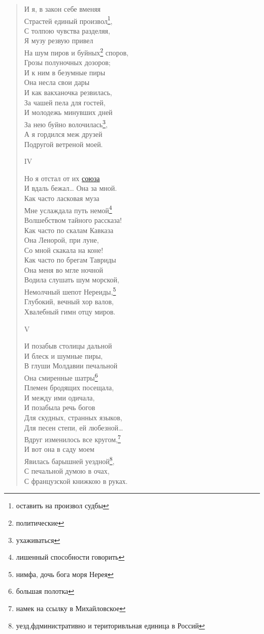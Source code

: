 \begin{verse}
И я, в закон себе вменяя\\
Страстей единый произвол\footnote{оставить на произвол судбы},\\
С толпою чувства разделяя,\\
Я музу резвую привел\\
На шум пиров и буйных\footnote{политические} споров,\\
Грозы полуночных дозоров;\\
И к ним в безумные пиры\\
Она несла свои дары\\
И как вакханочка резвилась,\\
За чашей пела для гостей,\\
И молодежь минувших дней\\
За нею буйно волочилась\footnote{ухаживаться},\\
А я гордился меж друзей\\
Подругой ветреной моей.

IV

Но я отстал от их \hyperref[soiuz]{союза}\\
И вдаль бежал… Она за мной.\\
Как часто ласковая муза\\
Мне услаждала путь немой\footnote{лишенный способности говорить}\\
Волшебством тайного рассказа!\\
Как часто по скалам Кавказа\\
Она Ленорой, при луне,\\
Со мной скакала на коне!\\
Как часто по брегам Тавриды\\
Она меня во мгле ночной\\
Водила слушать шум морской,\\
Немолчный шепот Нереиды,\footnote{нимфа, дочь бога моря Нерея}\\
Глубокий, вечный хор валов,\\
Хвалебный гимн отцу миров.

V

И позабыв столицы дальной\\
И блеск и шумные пиры,\\
В глуши Молдавии печальной\\
Она смиренные шатры\footnote{большая полотка}\\
Племен бродящих посещала,\\
И между ими одичала,\\
И позабыла речь богов\\
Для скудных, странных языков,\\
Для песен степи, ей любезной…\\
Вдруг изменилось все кругом,\footnote{намек на ссылку в Михайловское}\\
И вот она в саду моем\\
Явилась барышней уездной\footnote{уезд,фдминистративно и територивльная единица в Россий},\\
С печальной думою в очах,\\
С французской книжкою в руках.


\end{verse}
